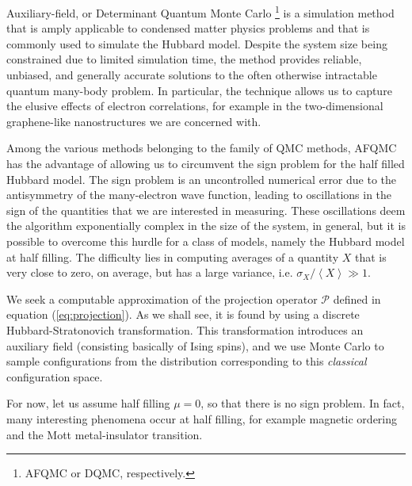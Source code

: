 Auxiliary-field, or Determinant Quantum Monte Carlo \footnote{AFQMC or DQMC, respectively.} is a simulation method that is amply applicable to condensed matter physics problems and that is commonly used to simulate the Hubbard model. Despite the system size being constrained due to limited simulation time, the method provides reliable, unbiased, and generally accurate solutions to the often otherwise intractable quantum many-body problem. In particular, the technique allows us to capture the elusive effects of electron correlations, for example in the two-dimensional graphene-like nanostructures we are concerned with.

Among the various methods belonging to the family of QMC methods, AFQMC has the advantage of  allowing us to circumvent the sign problem for the half filled Hubbard model. The sign problem is an uncontrolled numerical error due to the antisymmetry of the many-electron wave function, leading to oscillations in the sign of the quantities that we are interested in measuring. These oscillations deem the algorithm exponentially complex in the size of the system, in general, but it is possible to overcome this hurdle for a class of models, namely the Hubbard model at half filling. The difficulty lies in computing averages of a quantity $X$ that is very close to zero, on average, but has a large variance, i.e. $\sigma_X / \left\langle X \right\rangle \gg 1$.

We seek a computable approximation of the projection operator $\mathcal{P}$ defined in equation (\ref{eq:projection}). As we shall see, it is found by using a discrete Hubbard-Stratonovich transformation. This transformation introduces an auxiliary field (consisting basically of Ising spins), and we use Monte Carlo to sample configurations from the distribution corresponding to this \emph{classical} configuration space.

For now, let us assume half filling $\mu = 0$, so that there is no sign problem. In fact, many interesting phenomena occur at half filling, for example magnetic ordering and the Mott metal-insulator transition.

\normalfont


\cleardoublepage
